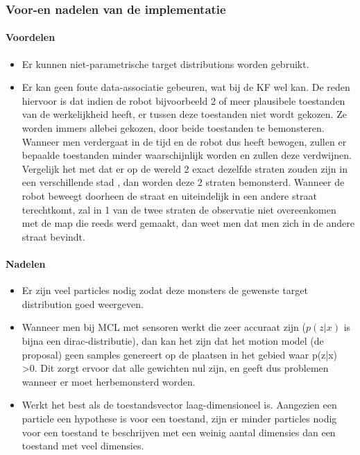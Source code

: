\documentclass{book}
\begin{document}
\subsubsection{Voor-en nadelen van de implementatie}
\paragraph{Voordelen}
\begin{itemize}
\item Er kunnen niet-parametrische target distributions worden gebruikt.
\item Er kan geen foute data-associatie gebeuren, wat bij de KF wel kan. De reden hiervoor is dat indien de robot bijvoorbeeld 2 of meer plausibele toestanden van de werkelijkheid heeft, er tussen deze toestanden niet wordt gekozen. Ze worden immers allebei gekozen, door beide toestanden te bemonsteren. Wanneer men verdergaat in de tijd en de robot dus heeft bewogen, zullen er bepaalde toestanden minder waarschijnlijk worden en zullen deze verdwijnen. Vergelijk het met dat er op de wereld 2 exact dezelfde straten zouden zijn in een verschillende stad , dan worden deze 2 straten bemonsterd. Wanneer de robot beweegt doorheen de straat en uiteindelijk in een andere straat terechtkomt, zal in 1 van de twee straten de observatie niet overeenkomen met de map die reeds werd gemaakt, dan weet men dat men zich in de andere straat bevindt.  
\end{itemize}

\paragraph{Nadelen}
\begin{itemize}
\item Er zijn veel particles nodig zodat deze monsters de gewenste target distribution goed weergeven.
\item Wanneer men bij MCL met sensoren werkt die zeer accuraat zijn ($p(z|x)$ is bijna een dirac-distributie), dan kan het zijn dat het motion model (de proposal) geen samples genereert op de plaatsen in het gebied waar p(z|x) >0. Dit zorgt ervoor dat alle gewichten nul zijn, en geeft dus problemen wanneer er moet herbemonsterd worden.
\item Werkt het best als de toestandsvector laag-dimensioneel is. Aangezien een particle een hypothese is voor een toestand, zijn er minder particles nodig voor een toestand te beschrijven met een weinig aantal dimensies dan een toestand met veel dimensies. 
\label{nadelen}
\end{itemize}
\end{document}
